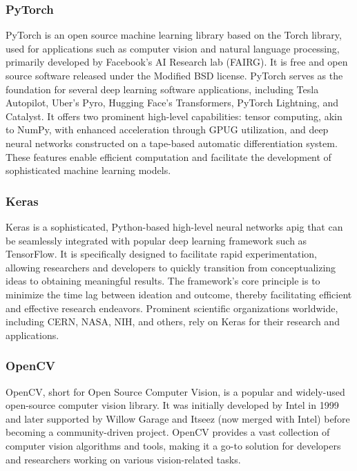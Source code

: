 \subsubsection{PyTorch}\label{subsubsec:pytorch}
PyTorch is an open source machine learning library based on the Torch library,
used for applications such as computer vision and natural language processing,
primarily developed by Facebook's AI Research lab (\gls{FAIRG}\glsfirstoccur). It is free and open
source software released under the Modified BSD license.
PyTorch serves as the foundation for several deep learning software applications, including Tesla Autopilot, Uber's Pyro, Hugging Face's Transformers, PyTorch Lightning, and Catalyst. 
It offers two prominent high-level capabilities: tensor computing, akin to NumPy, with enhanced acceleration through \gls{GPUG} utilization, and deep neural networks constructed on a tape-based automatic differentiation system. 
These features enable efficient computation and facilitate the development of sophisticated machine learning models.
\subsubsection{Keras}\label{subsubsec:keras}
Keras is a sophisticated, Python-based high-level neural networks \gls{apig} that can be seamlessly integrated with popular deep learning framework such as TensorFlow. 
It is specifically designed to facilitate rapid experimentation, allowing researchers and developers to quickly transition from conceptualizing ideas to obtaining meaningful results. 
The framework's core principle is to minimize the time lag between ideation and outcome, thereby facilitating efficient and effective research endeavors.
Prominent scientific organizations worldwide, including CERN, NASA, NIH, and others, rely on Keras for their research and applications. 
\subsubsection{OpenCV}\label{subsubsec:opencv}
OpenCV, short for Open Source Computer Vision, is a popular and widely-used open-source computer vision library. 
It was initially developed by Intel in 1999 and later supported by Willow Garage and Itseez (now merged with Intel) before becoming a community-driven project. 
OpenCV provides a vast collection of computer vision algorithms and tools, making it a go-to solution for developers and researchers working on various vision-related tasks.

